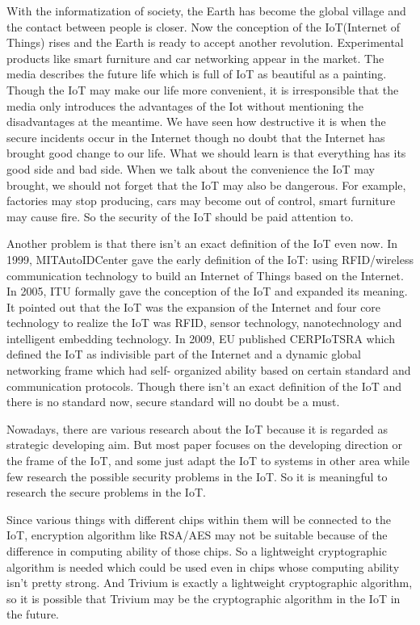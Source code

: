 \begin{bigabstract}
With the informatization of society, the Earth has become the global village and the contact between people is closer. Now the conception of the IoT(Internet of Things) rises and the Earth is ready to accept another revolution. Experimental products like smart furniture and car networking appear in the market. The media describes the future life which is full of IoT as beautiful as a painting. Though the IoT may make our life more convenient, it is irresponsible that the media only introduces the advantages of the Iot without mentioning the disadvantages at the meantime. We have seen how destructive it is when the secure incidents occur in the Internet though no doubt that the Internet has brought good change to our life. What we should learn is that everything has its good side and bad side. When we talk about the convenience the IoT may brought, we should not forget that the IoT may also be dangerous. For example, factories may stop producing, cars may become out of control, smart furniture may cause fire. So the security of the IoT should be paid attention to.

Another problem is that there isn’t an exact definition of the IoT even now. In 1999, MITAutoIDCenter gave the early definition of the IoT: using RFID/wireless communication technology to build an Internet of Things based on the Internet. In 2005, ITU formally gave the conception of the IoT and expanded its meaning. It pointed out that the IoT was the expansion of the Internet and four core technology to realize the IoT was RFID, sensor technology, nanotechnology and intelligent embedding technology. In 2009, EU published CERPIoTSRA which defined the IoT as indivisible part of the Internet and a dynamic global networking frame which had self- organized ability based on certain standard and communication protocols. Though there isn’t an exact definition of the IoT and there is no standard now, secure standard will no doubt be a must.

Nowadays, there are various research about the IoT because it is regarded as strategic developing aim. But most paper focuses on the developing direction or the frame of the IoT, and some just adapt the IoT to systems in other area while few research the possible security problems in the IoT. So it is meaningful to research the secure problems in the IoT.

Since various things with different chips within them will be connected to the IoT, encryption algorithm like RSA/AES may not be suitable because of the difference in computing ability of those chips. So a lightweight cryptographic algorithm is needed which could be used even in chips whose computing ability isn’t pretty strong. And Trivium is exactly a lightweight cryptographic algorithm, so it is possible that Trivium may be the cryptographic algorithm in the IoT in the future. 


\end{bigabstract}
